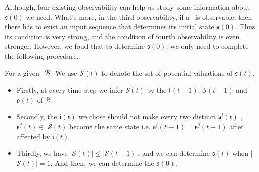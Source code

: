 Although, four existing observability can help us study some information about $\mathfrak{s}(0)$ we need. %
What's more, in the third observability, if a \BCN\ is observable, then there has to exist an input sequence that determines its initial state $\mathfrak{s}(0)$. Thus its condition is very strong, and the condition of fourth observability is even stronger. However, we foud that to determine $\mathfrak{s}(0)$, we only need to complete the following procedure.

For a given \BCN\  ${\mathcal{B}}$.  We use $\mathcal{S}(t)$ to denote the set of potential valuations of $\mathfrak{s}(t)$.
\begin{itemize}
	\item  Firstly, at every time step we infer $\mathcal{S}(t)$ by the $\mathfrak{i}(t-1)$, $\mathcal{S}(t-1)$ and $\mathfrak{o}(t)$ of ${\mathcal{B}}$.
	\item Secondly, the $\mathfrak{i}(t)$ we chose should not make every two distinct $\mathfrak{s}^{i}(t)$ , $\mathfrak{s}^{j}(t)$$\in$ $\mathcal{S}(t)$ become the same state i.e. $\mathfrak{s}^{i}(t+1)=$$\mathfrak{s}^{j}(t+1)$ after affected by $\mathfrak{i}(t)$.  
	\item Thirdly, we have $|$$\mathcal{S}(t)$$|\le|$$\mathcal{S}(t-1)$$|$, and we can determine $\mathfrak{s}(t)$ when $|$$\mathcal{S}(t)$$|=1$. And then, we can determine the $\mathfrak{s}(0)$.
\end{itemize}

